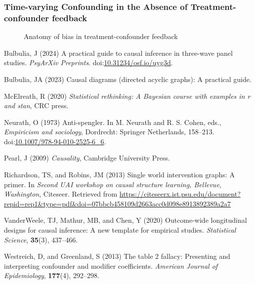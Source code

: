 \documentclass[
  single column]{article}
\newlength{\cslhangindent}
\newenvironment{CSLReferences}[2] %
 {\begin{list}{}{%
  \setlength{\itemindent}{0pt}
  \setlength{\leftmargin}{0pt}
  \setlength{\parsep}{0pt}
  \ifodd #1
   \setlength{\leftmargin}{\cslhangindent}
   \setlength{\itemindent}{-1\cslhangindent}
  \fi
  \setlength{\itemsep}{#2\baselineskip}}}
 {\end{list}}
\begin{document}
\newpage{}

\subsubsection{Time-varying Confounding in the Absence of
Treatment-confounder
feedback}\label{time-varying-confounding-in-the-absence-of-treatment-confounder-feedback}

\begin{figure}

\centering{

\feedbackB

}

\caption{\label{fig-timevarying-nofeedback}Anatomy of bias in
treatment-confounder feedback}

\end{figure}%

\newpage{}

\label{refs}
\begin{CSLReferences}{1}{0}
Bulbulia, J (2024) A practical guide to causal inference in three-wave
panel studies. \emph{PsyArXiv Preprints}.
doi:\href{https://doi.org/10.31234/osf.io/uyg3d}{10.31234/osf.io/uyg3d}.

Bulbulia, JA (2023) Causal diagrams (directed acyclic graphs): A
practical guide.

McElreath, R (2020) \emph{Statistical rethinking: A {B}ayesian course
with examples in r and stan}, CRC press.

Neurath, O (1973) Anti-spengler. In M. Neurath and R. S. Cohen, eds.,
\emph{Empiricism and sociology}, Dordrecht: Springer Netherlands,
158--213.
doi:\href{https://doi.org/10.1007/978-94-010-2525-6_6}{10.1007/978-94-010-2525-6\_6}.

Pearl, J (2009) \emph{Causality}, Cambridge University Press.

Richardson, TS, and Robins, JM (2013) Single world intervention graphs:
A primer. In \emph{Second UAI workshop on causal structure learning,
{B}ellevue, {W}ashington}, Citeseer. Retrieved from
\url{https://citeseerx.ist.psu.edu/document?repid=rep1&type=pdf&doi=07bbcb458109d2663acc0d098e8913892389a2a7}

VanderWeele, TJ, Mathur, MB, and Chen, Y (2020) Outcome-wide
longitudinal designs for causal inference: A new template for empirical
studies. \emph{Statistical Science}, \textbf{35}(3), 437--466.

Westreich, D, and Greenland, S (2013) The table 2 fallacy: Presenting
and interpreting confounder and modifier coefficients. \emph{American
Journal of Epidemiology}, \textbf{177}(4), 292--298.

\end{CSLReferences}
\end{document}
